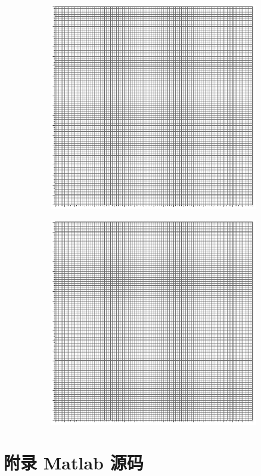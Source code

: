 \documentclass[UTF8]{article}
\begin{document}
\begin{figure}[H]\centering
\begin{subfigure}[b]{0.5\columnwidth}\centering
    \includegraphics[width=\columnwidth]{assets/100x100.pdf}
\end{subfigure}\hfill
\begin{subfigure}[b]{0.5\columnwidth}\centering
    \includegraphics[width=\columnwidth]{assets/100x100.pdf}
\end{subfigure}
\end{figure}

\newpage
\section*{附录 \hspace*{10pt} Matlab 源码}

\end{document}
